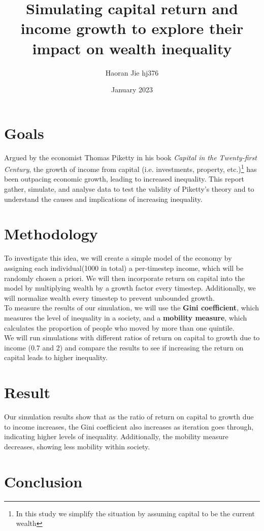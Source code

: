 \documentclass{article}
\title{Simulating capital return and income growth to explore their impact on wealth inequality
}
\author{Haoran Jie hj376}
\date{January 2023}
\begin{document}
\maketitle


\section*{Goals}
Argued by the economist Thomas Piketty in his book \textit{Capital in the Twenty-first Century}, the growth of income from capital (i.e. investments, property, etc.)\footnote{In this study we simplify the situation by assuming capital to be the current wealth} has been outpacing economic growth, leading to increased inequality. This report gather, simulate, and analyse data to test the validity of Piketty's theory and to understand the causes and implications of increasing inequality.

\section*{Methodology}
To investigate this idea, we will create a simple model of the economy by assigning each individual(1000 in total) a per-timestep income, 
which will be randomly chosen a priori. We will then incorporate return on capital into the model by multiplying wealth by a growth factor every timestep.
Additionally, we will normalize wealth every timestep to prevent unbounded growth.\\
To measure the results of our simulation, we will use the \textbf{Gini coefficient}, which measures the level of inequality in a society, 
and a \textbf{mobility measure}, which calculates the proportion of people who moved by more than one quintile.\\
We will run simulations with different ratios of return on capital to growth due to income (0.7 and 2) and compare the results to see if increasing the return on capital leads to higher inequality.






\section*{Result}
Our simulation results show that as the ratio of return on capital to growth due to income increases, 
the Gini coefficient also increases as iteration goes through, indicating higher levels of inequality. 
Additionally, the mobility measure decreases, showing less mobility within society.

\section*{Conclusion}
\end{document}

